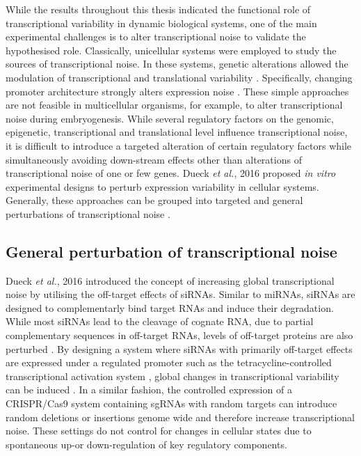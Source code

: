 While the results throughout this thesis indicated the functional role of transcriptional variability in dynamic biological systems, one of the main experimental challenges is to alter transcriptional noise to validate the hypothesised role. Classically, unicellular systems were employed to study the sources of transcriptional noise. In these systems, genetic alterations allowed the modulation of transcriptional and translational variability \cite{Raser2004, Raser2005, Ozbudak2002, Hornung2012}. Specifically, changing promoter architecture strongly alters expression noise \cite{Jones2014, Sharon2014}. These simple approaches are not feasible in multicellular organisms, for example, to alter transcriptional noise during embryogenesis. While several regulatory factors on the genomic, epigenetic, transcriptional and translational level influence transcriptional noise, it is difficult to introduce a targeted alteration of certain regulatory factors while simultaneously avoiding down-stream effects other than alterations of transcriptional noise of one or few genes. Dueck \emph{et al.}, 2016 proposed \emph{in vitro} experimental designs to perturb expression variability in cellular systems. Generally, these approaches can be grouped into targeted and general perturbations of transcriptional noise \citep{Dueck2016}.

\subsection{General perturbation of transcriptional noise} 

Dueck \emph{et al.}, 2016 introduced the concept of increasing global transcriptional noise by utilising the off-target effects of \glspl{siRNA}. Similar to miRNAs, siRNAs are designed to complementarly bind target RNAs and induce their degradation. While most siRNAs lead to the cleavage of cognate RNA, due to partial complementary sequences in off-target RNAs, levels of off-target proteins are also perturbed \citep{Scacheri2004}. By designing a system where siRNAs with primarily off-target effects are expressed under a regulated promoter such as the tetracycline-controlled transcriptional activation system \citep{Gossen1995}, global changes in transcriptional variability can be induced \citep{Dueck2016}. In a similar fashion, the controlled expression of a CRISPR/Cas9 system containing \glspl{sgRNA} with random targets can introduce random deletions or insertions genome wide and therefore increase transcriptional noise. These settings do not control for changes in cellular states due to spontaneous up-or down-regulation of key regulatory components. 

